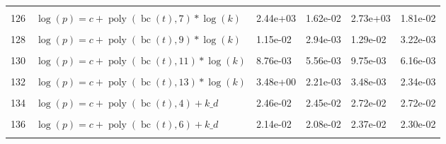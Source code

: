 \documentclass[12pt,a4paper]{article}
\DeclareMathOperator{\bc}{bc}
\DeclareMathOperator{\poly}{poly}
\begin{document}
\begin{longtable}[t]{ll>{\raggedleft\arraybackslash}p{2cm}>{\raggedleft\arraybackslash}p{2cm}>{\raggedleft\arraybackslash}p{2cm}>{\raggedleft\arraybackslash}p{2cm}}
\cellcolor{gray!6}{125} & \cellcolor{gray!6}{$\log(p) = c + \poly\left( \bc(t), 6 \right) * \log(k)$} & \cellcolor{gray!6}{7.80e-03} & \cellcolor{gray!6}{6.89e-03} & \cellcolor{gray!6}{8.68e-03} & \cellcolor{gray!6}{7.66e-03}\\
126 & $\log(p) = c + \poly\left( \bc(t), 7 \right) * \log(k)$ & 2.44e+03 & 1.62e-02 & 2.73e+03 & 1.81e-02\\
\cellcolor{gray!6}{127} & \cellcolor{gray!6}{$\log(p) = c + \poly\left( \bc(t), 8 \right) * \log(k)$} & \cellcolor{gray!6}{1.32e-02} & \cellcolor{gray!6}{9.75e-03} & \cellcolor{gray!6}{1.47e-02} & \cellcolor{gray!6}{1.08e-02}\\
128 & $\log(p) = c + \poly\left( \bc(t), 9 \right) * \log(k)$ & 1.15e-02 & 2.94e-03 & 1.29e-02 & 3.22e-03\\
\cellcolor{gray!6}{129} & \cellcolor{gray!6}{$\log(p) = c + \poly\left( \bc(t), 10 \right) * \log(k)$} & \cellcolor{gray!6}{3.82e-03} & \cellcolor{gray!6}{1.96e-03} & \cellcolor{gray!6}{4.22e-03} & \cellcolor{gray!6}{2.11e-03}\\
130 & $\log(p) = c + \poly\left( \bc(t), 11 \right) * \log(k)$ & 8.76e-03 & 5.56e-03 & 9.75e-03 & 6.16e-03\\
\cellcolor{gray!6}{131} & \cellcolor{gray!6}{$\log(p) = c + \poly\left( \bc(t), 12 \right) * \log(k)$} & \cellcolor{gray!6}{2.22e+01} & \cellcolor{gray!6}{6.42e-03} & \cellcolor{gray!6}{2.48e+01} & \cellcolor{gray!6}{7.13e-03}\\
132 & $\log(p) = c + \poly\left( \bc(t), 13 \right) * \log(k)$ & 3.48e+00 & 2.21e-03 & 3.48e-03 & 2.34e-03\\
\cellcolor{gray!6}{133} & \cellcolor{gray!6}{$\log(p) = c + \poly\left( \bc(t), 3 \right) + k\_d$} & \cellcolor{gray!6}{3.07e-02} & \cellcolor{gray!6}{2.33e-02} & \cellcolor{gray!6}{3.41e-02} & \cellcolor{gray!6}{2.58e-02}\\
134 & $\log(p) = c + \poly\left( \bc(t), 4 \right) + k\_d$ & 2.46e-02 & 2.45e-02 & 2.72e-02 & 2.72e-02\\
\cellcolor{gray!6}{135} & \cellcolor{gray!6}{$\log(p) = c + \poly\left( \bc(t), 5 \right) + k\_d$} & \cellcolor{gray!6}{2.18e-02} & \cellcolor{gray!6}{2.09e-02} & \cellcolor{gray!6}{2.41e-02} & \cellcolor{gray!6}{2.31e-02}\\
136 & $\log(p) = c + \poly\left( \bc(t), 6 \right) + k\_d$ & 2.14e-02 & 2.08e-02 & 2.37e-02 & 2.30e-02\\
\cellcolor{gray!6}{137} & \cellcolor{gray!6}{$\log(p) = c + \poly\left( \bc(t), 7 \right) + k\_d$} & \cellcolor{gray!6}{2.09e-02} & \cellcolor{gray!6}{2.08e-02} & \cellcolor{gray!6}{2.31e-02} & \cellcolor{gray!6}{2.30e-02}\\

\end{longtable}
\end{document}
